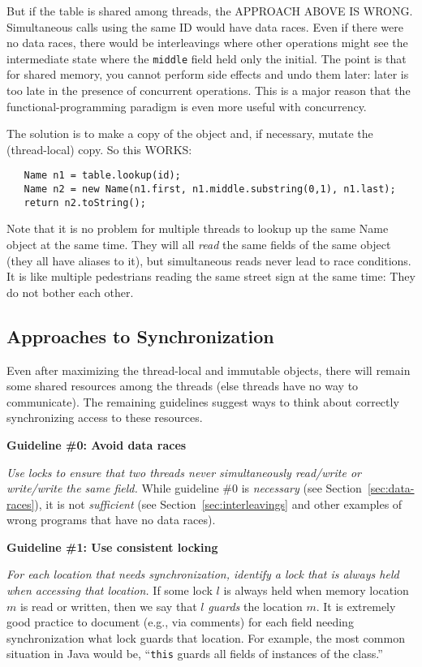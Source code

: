 \documentclass[10pt]{article}
\begin{document}
But if the table is shared among threads, the APPROACH ABOVE IS WRONG.
Simultaneous calls using the same ID would have data races.  Even if
there were no data races, there would be interleavings where other
operations might see the intermediate state where the {\tt middle}
field held only the initial.  The point is that for shared memory, you
cannot perform side effects and undo them later: later is too late in the
presence of concurrent operations.  This is a major reason that the
functional-programming paradigm is even more useful with concurrency.

The solution is to make a copy of the object and, if necessary, mutate the
(thread-local) copy.  So this WORKS:
\begin{verbatim}
   Name n1 = table.lookup(id);
   Name n2 = new Name(n1.first, n1.middle.substring(0,1), n1.last);
   return n2.toString();
\end{verbatim}

Note that it is no problem for multiple threads to lookup up the same
Name object at the same time.  They will all \emph{read} the same
fields of the same object (they all have aliases to it), but
simultaneous reads never lead to race conditions.  It is like
multiple pedestrians reading the same street sign at the same time:
They do not bother each other.

\subsection{Approaches to Synchronization}

Even after maximizing the thread-local and immutable objects, there
will remain some shared resources among the threads (else threads have
no way to communicate).  The remaining guidelines suggest ways to
think about correctly synchronizing access to these resources.

\medskip
\noindent\textbf{Guideline \#0: Avoid data races}  
\medskip

\emph{Use locks to ensure that two threads never simultaneously
  read/write or write/write the same field.}  While guideline \#0 is
\emph{necessary} (see Section~\ref{sec:data-races}), it is not
\emph{sufficient} (see Section~\ref{sec:interleavings} and other
examples of wrong programs that have no data races).

\medskip
\noindent\textbf{Guideline \#1: Use consistent locking}  
\medskip

\emph{For each location that needs synchronization, identify a lock
  that is always held when accessing that location.}  If some lock $l$
  is always held when memory location $m$ is read or written, then we
  say that $l$ \emph{guards} the location $m$.  It is extremely good
  practice to document (e.g., via comments) for each field needing
  synchronization what lock guards that location.  For example, the
  most common situation in Java would be, ``{\tt this} guards all
  fields of instances of the class.''
\end{document}
